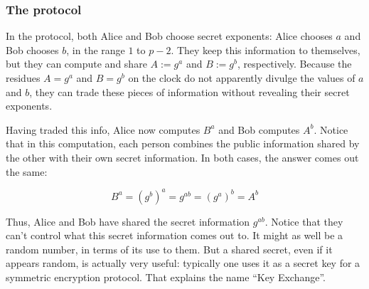 \documentclass{article}
\theoremstyle{plain}
\theoremstyle{definition}
\theoremstyle{remark}
\numberwithin{theorem}{section}
\newcommand{\ZZ}{\mathbb{Z}}
\newcommand{\bespokedemo}[1]{\href{bespoke:#1}{\textsf{[\,interactive: #1\,]}}}
\newif\ifweb \webfalse
\DeclareRobustCommand{\webonly}[1]{\ifweb#1\fi}
\begin{document}
\begin{center}
\end{center}

\webonly{\bespokedemo{primitive-root-clock}}

\subsubsection{The protocol}

In the protocol, both Alice and Bob choose secret exponents:  Alice chooses $a$ and Bob chooses $b$, in the range $1$ to $p-2$.  They keep this information to themselves, but they can compute and share $A := g^a$ and $B := g^b$, respectively.  Because the residues $A = g^a$ and $B = g^b$ on the clock do not apparently divulge the values of $a$ and $b$, they can trade these pieces of information without revealing their secret exponents.



Having traded this info, Alice now computes $B^a$ and Bob computes $A^b$.  Notice that in this computation, each person combines the public information shared by the other with their own secret information.  In both cases, the answer comes out the same:

$$ 
B^a = (g^b)^a = g^{ab} = (g^a)^b = A^b 
$$

Thus, Alice and Bob have shared the secret information $g^{ab}$.  Notice that they can't control what this secret information comes out to.  It might as well be a random number, in terms of its use to them.  But a shared secret, even if it appears random, is actually very useful:  typically one uses it as a secret key for a symmetric encryption protocol.  That explains the name ``Key Exchange''.
\end{document}
